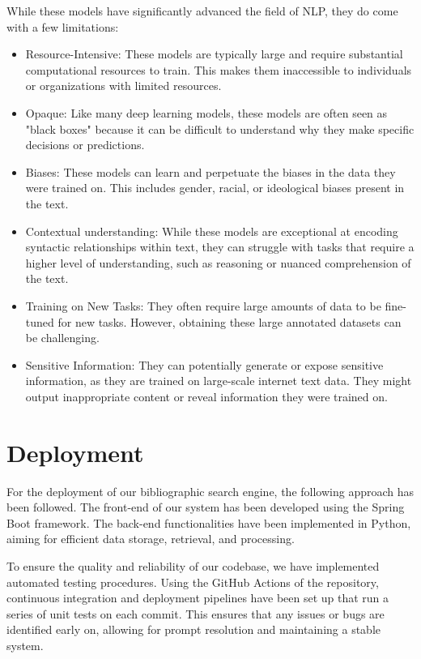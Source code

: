 \documentclass{article}
\begin{document}
While these models have significantly advanced the field of NLP, they do come with a few limitations:
\begin{itemize}
    \item Resource-Intensive: These models are typically large and require substantial computational resources to train. This makes them inaccessible to individuals or organizations with limited resources.

    \item Opaque: Like many deep learning models, these models are often seen as "black boxes" because it can be difficult to understand why they make specific decisions or predictions.

    \item Biases: These models can learn and perpetuate the biases in the data they were trained on. This includes gender, racial, or ideological biases present in the text.

    \item Contextual understanding: While these models are exceptional at encoding syntactic relationships within text, they can struggle with tasks that require a higher level of understanding, such as reasoning or nuanced comprehension of the text.

    \item Training on New Tasks: They often require large amounts of data to be fine-tuned for new tasks. However, obtaining these large annotated datasets can be challenging.

    \item Sensitive Information: They can potentially generate or expose sensitive information, as they are trained on large-scale internet text data. They might output inappropriate content or reveal information they were trained on.
\end{itemize}

\section{Deployment}
For the deployment of our bibliographic search engine, the following approach has been followed.
The front-end of our system has been developed using the Spring Boot framework.
The back-end functionalities have been implemented in Python, aiming for efficient data storage, 
retrieval, and processing. 

To ensure the quality and reliability of our codebase, we have implemented automated testing 
procedures. Using the GitHub Actions of the repository, 
continuous integration and deployment pipelines have been set up that run a series of unit tests 
on each commit. This ensures that any issues or bugs are identified early on, allowing for 
prompt resolution and maintaining a stable system.
\end{document}
